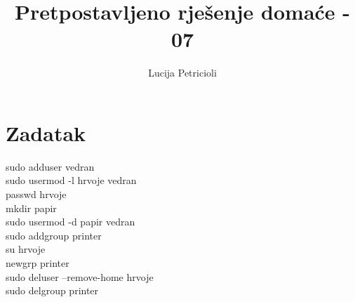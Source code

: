 \documentclass[12pt,a4paper]{article}
\begin{document}
	\title{Pretpostavljeno rješenje domaće - 07}
	\maketitle
	\author{Lucija Petricioli}
	\section{Zadatak}
	sudo adduser vedran \\
	sudo usermod -l hrvoje vedran \\
	passwd hrvoje \\
	mkdir papir \\
	sudo usermod -d papir vedran \\
	sudo addgroup printer \\
	su hrvoje \\
	newgrp printer \\
	sudo deluser --remove-home hrvoje \\
	sudo delgroup printer
	
	
	
\end{document}
